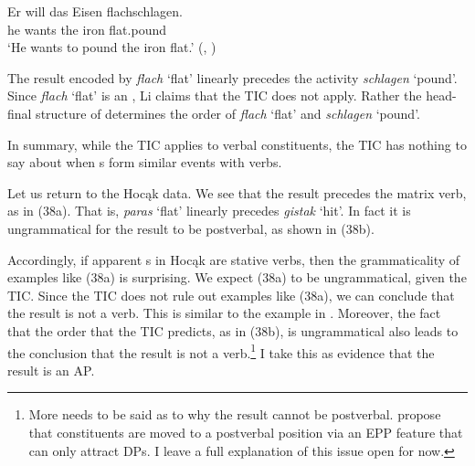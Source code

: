 \documentclass[output=paper]{LSP/langsci}
\begin{document}
\begin{exe}
\ex\label{ex:rosen:37}
 \gll Er will das Eisen flachschlagen.\\
he wants the iron flat.pound\\
\glt `He wants to pound the iron flat.' (\citealt[501]{Li1993}, )

\end{exe}

The result encoded by \textit{flach} `flat' linearly precedes the activity \textit{schlagen} `pound'. Since \textit{flach} `flat' is an , Li claims that the TIC does not apply. Rather the head-final structure of  determines the order of \textit{flach} `flat' and \textit{schlagen} `pound'. 

In summary, while the TIC applies to verbal constituents, the TIC has nothing to say about when s form similar events with verbs.

Let us return to the Hocąk data. We see that the result precedes the matrix verb, as in (38a). That is, \textit{paras} `flat' linearly precedes \textit{gistak} `hit'. In fact it is ungrammatical for the result to be postverbal, as shown in (38b).

\begin{exe}
\ex\label{ex:rosen:38}
\begin{xlist}



\end{xlist}
\end{exe}

 
Accordingly, if apparent s in Hocąk are stative verbs, then the grammaticality of examples like (38a) is surprising. We expect (38a) to be ungrammatical, given the TIC. Since the TIC does not rule out examples like (38a), we can conclude that the result is not a verb. This is similar to the  example in . Moreover, the fact that the order that the TIC predicts, as in (38b), is ungrammatical also leads to the conclusion that the result is not a verb.\footnote{More needs to be said as to why the result cannot be postverbal. \citet{JohnsonRosen2014} propose that constituents are moved to a postverbal position via an EPP feature that can only attract DPs. I leave a full explanation of this issue open for now.} I take this as evidence that the result is an AP.
 
\end{document}
